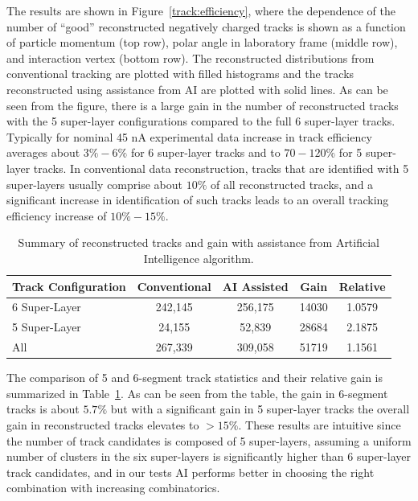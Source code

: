 The results are shown in Figure~\ref{track:efficiency}, where the dependence of the number 
of ``good'' reconstructed negatively charged tracks is shown as a function of particle 
momentum (top row), polar angle in laboratory frame (middle row), and interaction vertex 
(bottom row). The reconstructed distributions from conventional tracking are plotted with 
filled histograms and the tracks reconstructed using assistance from AI are plotted with 
solid lines. As can be seen from the figure, there is a large gain in the number of reconstructed 
tracks with the 5 super-layer configurations compared to the full 6 super-layer tracks. Typically 
for nominal 45 nA experimental data increase in track efficiency averages about $3\%-6\%$ 
for 6 super-layer tracks and to $70-120\%$ for 5 super-layer tracks. In conventional data 
reconstruction, tracks that are identified with 5 super-layers usually comprise about $10\%$ 
of all reconstructed tracks, and a significant increase in identification of such tracks leads to 
an overall tracking efficiency increase of $10\%-15\%$. 
 
 \begin{table}[!h]
 \begin{center}
 \begin{tabular}{|l|c|c|c|c|}
 \hline
 Track Configuration & Conventional & AI Assisted & Gain & Relative \\
 \hline
 \hline
 6 Super-Layer & 242,145 & 256,175 & 14030 & 1.0579 \\
 5 Super-Layer & 24,155 & 52,839 & 28684 & 2.1875 \\
 All & 267,339 & 309,058 & 51719 & 1.1561 \\
 \hline
 \end{tabular}
 \end{center}
 \caption{Summary of reconstructed tracks and gain with assistance from Artificial Intelligence algorithm.}
 \label{tbl:summary}
 \end{table}
 
The comparison of 5 and 6-segment track statistics and their relative gain is 
summarized in Table~\ref{tbl:summary}. As can be seen from the table, the 
gain in 6-segment tracks is about $5.7\%$ but with a significant gain in 5 super-layer tracks 
the overall gain in reconstructed tracks elevates to $>15\%$. These results are intuitive 
since the number of track candidates is composed of 5 super-layers, assuming a uniform 
number of clusters in the six super-layers is significantly higher than 6 super-layer track 
candidates, and in our tests AI performs better in choosing the right combination with 
increasing combinatorics.
 
